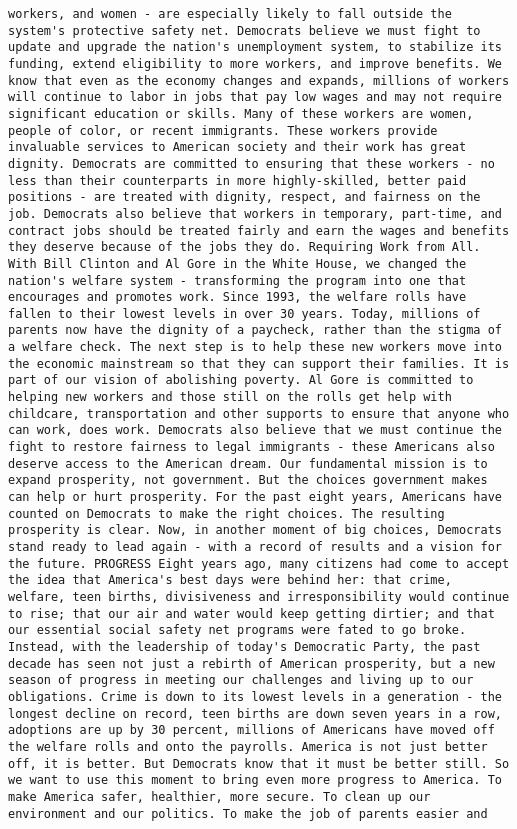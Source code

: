 \documentclass[
]{article}
\begin{document}
\begin{verbatim}
workers, and women - are especially likely to fall outside the system's protective safety net. Democrats believe we must fight to update and upgrade the nation's unemployment system, to stabilize its funding, extend eligibility to more workers, and improve benefits. We know that even as the economy changes and expands, millions of workers will continue to labor in jobs that pay low wages and may not require significant education or skills. Many of these workers are women, people of color, or recent immigrants. These workers provide invaluable services to American society and their work has great dignity. Democrats are committed to ensuring that these workers - no less than their counterparts in more highly-skilled, better paid positions - are treated with dignity, respect, and fairness on the job. Democrats also believe that workers in temporary, part-time, and contract jobs should be treated fairly and earn the wages and benefits they deserve because of the jobs they do. Requiring Work from All. With Bill Clinton and Al Gore in the White House, we changed the nation's welfare system - transforming the program into one that encourages and promotes work. Since 1993, the welfare rolls have fallen to their lowest levels in over 30 years. Today, millions of parents now have the dignity of a paycheck, rather than the stigma of a welfare check. The next step is to help these new workers move into the economic mainstream so that they can support their families. It is part of our vision of abolishing poverty. Al Gore is committed to helping new workers and those still on the rolls get help with childcare, transportation and other supports to ensure that anyone who can work, does work. Democrats also believe that we must continue the fight to restore fairness to legal immigrants - these Americans also deserve access to the American dream. Our fundamental mission is to expand prosperity, not government. But the choices government makes can help or hurt prosperity. For the past eight years, Americans have counted on Democrats to make the right choices. The resulting prosperity is clear. Now, in another moment of big choices, Democrats stand ready to lead again - with a record of results and a vision for the future. PROGRESS Eight years ago, many citizens had come to accept the idea that America's best days were behind her: that crime, welfare, teen births, divisiveness and irresponsibility would continue to rise; that our air and water would keep getting dirtier; and that our essential social safety net programs were fated to go broke. Instead, with the leadership of today's Democratic Party, the past decade has seen not just a rebirth of American prosperity, but a new season of progress in meeting our challenges and living up to our obligations. Crime is down to its lowest levels in a generation - the longest decline on record, teen births are down seven years in a row, adoptions are up by 30 percent, millions of Americans have moved off the welfare rolls and onto the payrolls. America is not just better off, it is better. But Democrats know that it must be better still. So we want to use this moment to bring even more progress to America. To make America safer, healthier, more secure. To clean up our environment and our politics. To make the job of parents easier and 
\end{verbatim}
\end{document}
